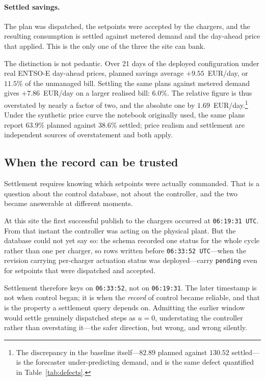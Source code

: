 \paragraph{Settled savings.} The plan was dispatched, the setpoints were
accepted by the chargers, and the resulting consumption is settled against
metered demand and the day-ahead price that applied. This is the only one of
the three the site can bank.

The distinction is not pedantic. Over 21 days of the deployed configuration
under real ENTSO-E day-ahead prices, planned savings average
$+9.55$~EUR/day, or $11.5\%$ of the unmanaged bill. Settling the same plans
against metered demand gives $+7.86$~EUR/day on a larger realised bill:
$6.0\%$. The relative figure is thus overstated by nearly a factor of two,
and the absolute one by $1.69$~EUR/day.\footnote{The discrepancy in the
baseline itself---$82.89$ planned against $130.52$ settled---is the forecaster
under-predicting demand, and is the same defect quantified in
Table~\ref{tab:defects}.} Under the synthetic price curve the notebook
originally used, the same plans report $63.9\%$ planned against $38.6\%$
settled; price realism and settlement are independent sources of overstatement
and both apply.

\subsection{When the record can be trusted}
\label{sec:boundary}

Settlement requires knowing which setpoints were actually commanded. That is a
question about the control database, not about the controller, and the two
became answerable at different moments.

At this site the first successful publish to the chargers occurred at
\texttt{06:19:31~UTC}. From that instant the controller was acting on the
physical plant. But the database could not yet say so: the schema recorded one
status for the whole cycle rather than one per charger, so rows written before
\texttt{06:33:52~UTC}---when the revision carrying per-charger actuation
status was deployed---carry \texttt{pending} even for setpoints that were
dispatched and accepted.

Settlement therefore keys on \texttt{06:33:52}, not on \texttt{06:19:31}. The
later timestamp is not when control began; it is when the \emph{record} of
control became reliable, and that is the property a settlement query depends
on. Admitting the earlier window would settle genuinely dispatched steps as
$u=0$, understating the controller rather than overstating it---the safer
direction, but wrong, and wrong silently.

